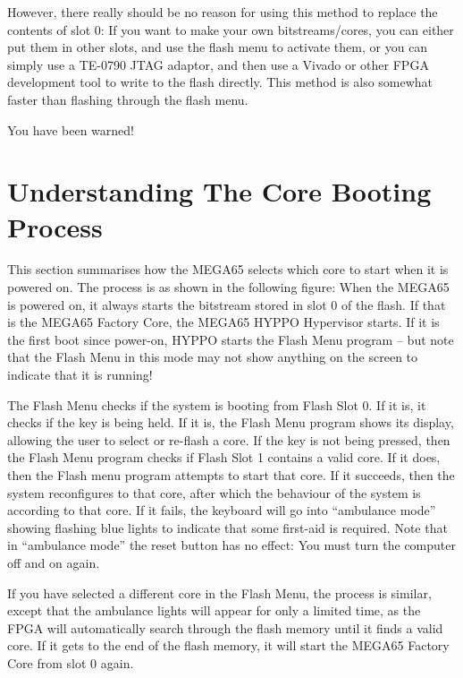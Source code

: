 However, there really should be no reason for using this method to replace the contents of slot 0:
If you want to make your own bitstreams/cores, you can either put them in other slots, and use the
flash menu to activate them, or you can simply use a TE-0790 JTAG adaptor, and then use
a Vivado or other FPGA development tool to write to the flash directly. This method is also
somewhat faster than flashing through the flash menu.

You have been warned!

\section{Understanding The Core Booting Process}

This section summarises how the MEGA65 selects which core to start when it is powered on.
The process is as shown in the following figure: When the MEGA65 is
powered on, it always starts the bitstream stored in slot 0 of the
flash.  If that is the MEGA65 Factory Core, the MEGA65 HYPPO
Hypervisor starts.  If it is the first boot since power-on, HYPPO
starts the Flash Menu program -- but note that the Flash Menu in
this mode may not show anything on the screen to indicate that it is
running!

The Flash Menu checks if the system is booting from Flash
Slot 0.  If it is, it checks if the  key is being held.  If
it is, the Flash Menu program shows its display, allowing the user
to select or re-flash a core. If the  key is not being
pressed, then the Flash Menu program checks if Flash Slot 1 contains a valid
core.  If it does, then the Flash menu program attempts to start
that core.  If it succeeds, then the system reconfigures to that core,
after which the behaviour of the system is according to that core. If
it fails, the keyboard will go into ``ambulance mode'' showing flashing blue
lights to indicate that some first-aid is required.  Note that in ``ambulance
mode'' the reset button has no effect: You must turn the computer off
and on again.

If you have selected a different core in the Flash Menu, the process
is similar, except that the ambulance lights will appear for only a
limited time, as the FPGA will automatically search through the flash
memory until it finds a valid core. If it gets to the end of the flash
memory, it will start the MEGA65 Factory Core from slot 0 again.

